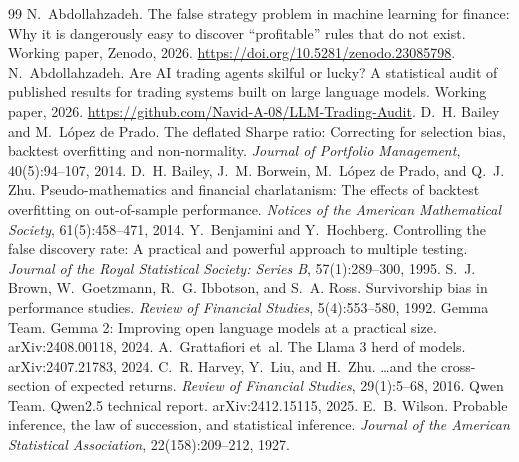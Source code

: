 \documentclass[11pt]{article}
\begin{document}
\begin{thebibliography}{99}
N.~Abdollahzadeh. The false strategy problem in machine learning for finance: Why it is dangerously easy to discover ``profitable'' rules that do not exist. Working paper, Zenodo, 2026. \url{https://doi.org/10.5281/zenodo.23085798}.
N.~Abdollahzadeh. Are AI trading agents skilful or lucky? A statistical audit of published results for trading systems built on large language models. Working paper, 2026. \url{https://github.com/Navid-A-08/LLM-Trading-Audit}.
D.~H. Bailey and M.~L{\'o}pez de Prado. The deflated Sharpe ratio: Correcting for selection bias, backtest overfitting and non-normality. \emph{Journal of Portfolio Management}, 40(5):94--107, 2014.
D.~H. Bailey, J.~M. Borwein, M.~L{\'o}pez de Prado, and Q.~J. Zhu. Pseudo-mathematics and financial charlatanism: The effects of backtest overfitting on out-of-sample performance. \emph{Notices of the American Mathematical Society}, 61(5):458--471, 2014.
Y.~Benjamini and Y.~Hochberg. Controlling the false discovery rate: A practical and powerful approach to multiple testing. \emph{Journal of the Royal Statistical Society: Series B}, 57(1):289--300, 1995.
S.~J. Brown, W.~Goetzmann, R.~G. Ibbotson, and S.~A. Ross. Survivorship bias in performance studies. \emph{Review of Financial Studies}, 5(4):553--580, 1992.
Gemma Team. Gemma 2: Improving open language models at a practical size. arXiv:2408.00118, 2024.
A.~Grattafiori et~al. The Llama 3 herd of models. arXiv:2407.21783, 2024.
C.~R. Harvey, Y.~Liu, and H.~Zhu. \ldots and the cross-section of expected returns. \emph{Review of Financial Studies}, 29(1):5--68, 2016.
Qwen Team. Qwen2.5 technical report. arXiv:2412.15115, 2025.
E.~B. Wilson. Probable inference, the law of succession, and statistical inference. \emph{Journal of the American Statistical Association}, 22(158):209--212, 1927.
\end{thebibliography}

\appendix
\end{document}

